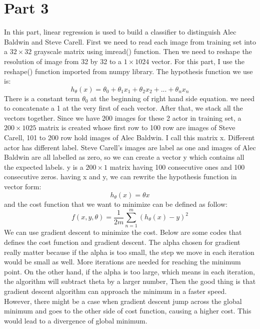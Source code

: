 \documentclass{article}
\begin{document}
\vspace*{2cm}
\section*{Part 3}
In this part, linear regression is used to build a classifier to distinguish Alec Baldwin and Steve Carell. First we need to read each image from training set into a $32 \times 32$ grayscale matrix using imread() function. Then we need to reshape the resolution of image from 32 by 32 to a $1 \times 1024$ vector. For this part, I use the reshape() function imported from numpy library. The hypothesis function we use is: \[ h_{\theta}(x) = \theta_{0} + \theta_{1}x_{1} + \theta_{2}x_{2} + ... + \theta_{n}x_{n} \]There is a constant term $\theta_{0}$ at the beginning of right hand side equation. we need to concatenate a 1 at the very first of each vector. After that, we stack all the vectors together. Since we have 200 images for these 2 actor in training set, a $200 \times 1025$ matrix is created whose first row to 100 row are images of Steve Carell, 101 to 200 row hold images of Alec Baldwin. I call this matrix x. Different actor has different label. Steve Carell's images are label as one and images of Alec Baldwin are all labelled as zero, so we can create a vector y which contains all the expected labels. y is a $200 \times 1$ matrix having 100 consecutive ones and 100 consecutive zeros. having x and y, we can rewrite the hypothesis function in vector form: \[ h_{\theta}(x) = \theta x\] and the cost function that we want to minimize can be defined as follow:\[ f(x, y, \theta) = \frac{1}{2m}\sum_{n=1}^{m} (h_{\theta}(x) - y)^2\]
We can use gradient descent to minimize the cost. Below are some codes that defines the cost function and gradient descent. The alpha chosen for gradient really matter because if the alpha is too small, the step we move in each iteration would be small as well. More iterations are needed for reaching the minimum point. On the other hand, if the alpha is too large, which means in each iteration, the algorithm will subtract theta by a larger number, Then the good thing is that gradient descent algorithm can approach the minimum in a faster speed. However, there might be a case when gradient descent jump across the global minimum and goes to the other side of cost function, causing a higher cost. This would lead to a divergence of global minimum.

\end{document}
